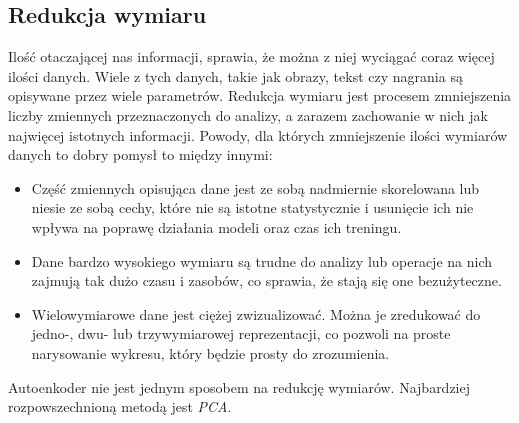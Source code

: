\documentclass[a4paper,12pt,oneside]{book} %
\begin{document}
\subsection{Redukcja wymiaru}
Ilość otaczającej nas informacji, sprawia, że można z niej wyciągać coraz więcej ilości danych. Wiele z tych danych, takie jak obrazy, tekst czy nagrania są opisywane przez wiele parametrów. Redukcja wymiaru jest procesem zmniejszenia liczby zmiennych przeznaczonych do analizy, a zarazem zachowanie w nich jak najwięcej istotnych informacji. Powody, dla których zmniejszenie ilości wymiarów danych to dobry pomysł to między innymi:
\begin{itemize}
	\item Część zmiennych opisująca dane jest ze sobą nadmiernie skorelowana lub niesie ze sobą cechy, które nie są istotne statystycznie i usunięcie ich nie wpływa na poprawę działania modeli oraz czas ich treningu.
	\item Dane bardzo wysokiego wymiaru są trudne do analizy lub operacje na nich zajmują tak dużo czasu i zasobów, co sprawia, że stają się one bezużyteczne. 
	\item Wielowymiarowe dane jest ciężej zwizualizować. Można je zredukować do jedno-, dwu- lub trzywymiarowej reprezentacji, co pozwoli na proste narysowanie wykresu, który będzie prosty do zrozumienia.
\end{itemize}
Autoenkoder nie jest jednym sposobem na redukcję wymiarów. Najbardziej rozpowszechnioną metodą jest \textit{PCA}. 
\end{document}
